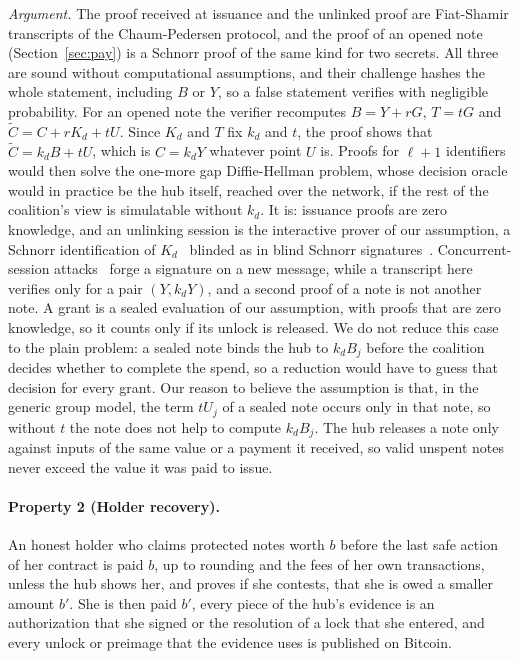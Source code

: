 \documentclass[11pt]{article}
\newcommand{\bresp}{b'}
\newcommand{\prop}[2]{\paragraph{Property #1 (#2).}}
\begin{document}
\emph{Argument.} The proof received at issuance and the unlinked proof are Fiat-Shamir transcripts of the Chaum-Pedersen protocol, and the proof of an opened note (Section~\ref{sec:pay}) is a Schnorr proof of the same kind for two secrets. All three are sound without computational assumptions, and their challenge hashes the whole statement, including $B$ or $Y$, so a false statement verifies with negligible probability. For an opened note the verifier recomputes $B=Y+rG$, $T=tG$ and $\tilde C=C+rK_d+tU$. Since $K_d$ and $T$ fix $k_d$ and $t$, the proof shows that $\tilde C=k_dB+tU$, which is $C=k_dY$ whatever point $U$ is. Proofs for $\ell+1$ identifiers would then solve the one-more gap Diffie-Hellman problem, whose decision oracle would in practice be the hub itself, reached over the network, if the rest of the coalition's view is simulatable without $k_d$. It is: issuance proofs are zero knowledge, and an unlinking session is the interactive prover of our assumption, a Schnorr identification of $K_d$~\cite{bellarepalacio} blinded as in blind Schnorr signatures~\cite{fps}. Concurrent-session attacks~\cite{ros} forge a signature on a new message, while a transcript here verifies only for a pair $(Y,k_dY)$, and a second proof of a note is not another note. A grant is a sealed evaluation of our assumption, with proofs that are zero knowledge, so it counts only if its unlock is released. We do not reduce this case to the plain problem: a sealed note binds the hub to $k_dB_j$ before the coalition decides whether to complete the spend, so a reduction would have to guess that decision for every grant. Our reason to believe the assumption is that, in the generic group model, the term $tU_j$ of a sealed note occurs only in that note, so without $t$ the note does not help to compute $k_dB_j$. The hub releases a note only against inputs of the same value or a payment it received, so valid unspent notes never exceed the value it was paid to issue.

\prop{2}{Holder recovery} An honest holder who claims protected notes worth $b$ before the last safe action of her contract is paid $b$, up to rounding and the fees of her own transactions, unless the hub shows her, and proves if she contests, that she is owed a smaller amount $\bresp$. She is then paid $\bresp$, every piece of the hub's evidence is an authorization that she signed or the resolution of a lock that she entered, and every unlock or preimage that the evidence uses is published on Bitcoin.
\end{document}
